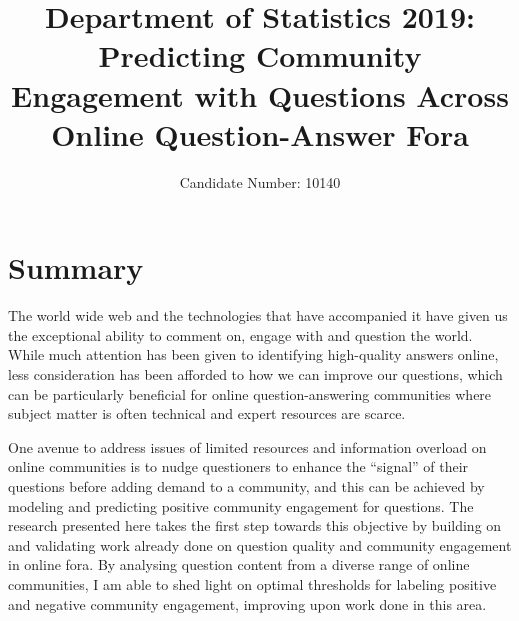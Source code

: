 \documentclass[11pt,preprint, authoryear]{article}
\title{Department of Statistics 2019: Predicting Community Engagement with
Questions Across Online Question-Answer Fora}
\author{Candidate Number: 10140}
\date{}
\numberwithin{equation}{section}
\numberwithin{figure}{section}
\numberwithin{table}{section}
\begin{document}
\pagestyle{fancy}
\chead{}
\rhead{}
\lfoot{}
\rfoot{} 
\lhead{}
\cfoot{\footnotesize \thepage\\}





\maketitle
\thispagestyle{empty}



\clearpage

\setcounter{page}{1}

\renewcommand{\contentsname}{Contents}
\hypersetup{linkcolor=black}
\tableofcontents
\newpage
\hypersetup{linkcolor=black}
\listoftables
\newpage
\hypersetup{linkcolor=black}
\listoffigures
\hypersetup{linkcolor=black}
\newpage


\renewcommand{\vec}[1]{\mathbf{#1}}


\section*{Summary}

\color{blue}The world wide web and the technologies that have
accompanied it have given us the exceptional ability to comment on,
engage with and question the world. While much attention has been given
to identifying high-quality answers online, less consideration has been
afforded to how we can improve our questions, which can be particularly
beneficial for online question-answering communities where subject
matter is often technical and expert resources are scarce.

One avenue to address issues of limited resources and information
overload on online communities is to nudge questioners to enhance the
``signal'' of their questions before adding demand to a community, and
this can be achieved by modeling and predicting positive community
engagement for questions. The research presented here takes the first
step towards this objective by building on and validating work already
done on question quality and community engagement in online fora. By
analysing question content from a diverse range of online communities, I
am able to shed light on optimal thresholds for labeling positive and
negative community engagement, improving upon work done in this area.
\end{document}
